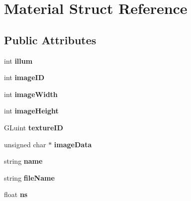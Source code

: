 \hypertarget{structMaterial}{\section{Material Struct Reference}
\label{structMaterial}
}
\subsection*{Public Attributes}
\begin{DoxyCompactItemize}
\item 
\hypertarget{structMaterial_acb698dee8dd625a68b470d35c4ce2a52}{int {\bfseries illum}}\label{structMaterial_acb698dee8dd625a68b470d35c4ce2a52}

\item 
\hypertarget{structMaterial_a57ff184aa459ee74ca9f473d1ed60adb}{int {\bfseries image\-I\-D}}\label{structMaterial_a57ff184aa459ee74ca9f473d1ed60adb}

\item 
\hypertarget{structMaterial_ae9ec390fa9b7b370ed70bb95ff6112bf}{int {\bfseries image\-Width}}\label{structMaterial_ae9ec390fa9b7b370ed70bb95ff6112bf}

\item 
\hypertarget{structMaterial_afda76f8ad603920e3f62f3bb17529116}{int {\bfseries image\-Height}}\label{structMaterial_afda76f8ad603920e3f62f3bb17529116}

\item 
\hypertarget{structMaterial_acfda72ce20da4961aa5159ff5be4c6bc}{G\-Luint {\bfseries texture\-I\-D}}\label{structMaterial_acfda72ce20da4961aa5159ff5be4c6bc}

\item 
\hypertarget{structMaterial_afd84d63c7b381ef6f976d4cb685c9f97}{unsigned char $\ast$ {\bfseries image\-Data}}\label{structMaterial_afd84d63c7b381ef6f976d4cb685c9f97}

\item 
\hypertarget{structMaterial_a988570645fdd4363ca975f5bb4e47205}{string {\bfseries name}}\label{structMaterial_a988570645fdd4363ca975f5bb4e47205}

\item 
\hypertarget{structMaterial_a6c689e98f398ee32c623375414334b8c}{string {\bfseries file\-Name}}\label{structMaterial_a6c689e98f398ee32c623375414334b8c}

\item 
\hypertarget{structMaterial_a49335919c5596c4523f71be7f01bdf9d}{float {\bfseries ns}}\label{structMaterial_a49335919c5596c4523f71be7f01bdf9d}


\end{DoxyCompactItemize}
